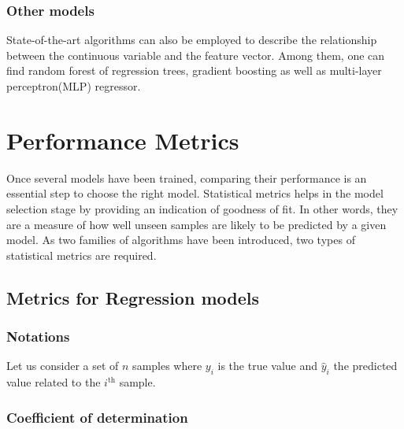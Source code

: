 \documentclass[
]{book}
\begin{document}
\hypertarget{other-models-1}{%
\subsubsection*{Other models}\label{other-models-1}}

State-of-the-art algorithms can also be employed to describe the relationship between the continuous variable and the feature vector. Among them, one can find random forest of regression trees, gradient boosting as well as multi-layer perceptron(MLP) regressor.

\hypertarget{performance-metrics}{%
\section{Performance Metrics}\label{performance-metrics}}

Once several models have been trained, comparing their performance is an essential step to choose the right model. Statistical metrics helps in the model selection stage by providing an indication of goodness of fit. In other words, they are a measure of how well unseen samples are likely to be predicted by a given model. As two families of algorithms have been introduced, two types of statistical metrics are required.

\hypertarget{metrics-for-regression-models}{%
\subsection{Metrics for Regression models}\label{metrics-for-regression-models}}

\hypertarget{notations-1}{%
\subsubsection*{Notations}\label{notations-1}}

Let us consider a set of \(n\) samples where \(y_i\) is the true value and \(\hat{y}_i\) the predicted value related to the \(i^\text{th}\) sample.

\hypertarget{coefficient-of-determination}{%
\subsubsection*{Coefficient of determination}\label{coefficient-of-determination}}
\end{document}
